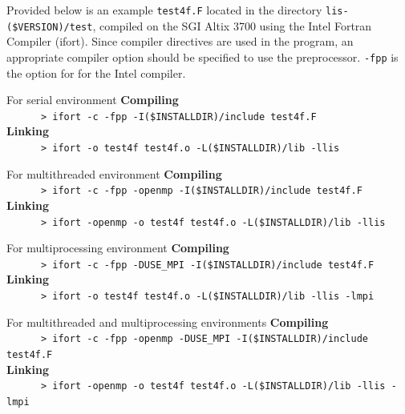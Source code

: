\documentclass[a4paper]{article}
\begin{document}
Provided below is an example \verb|test4f.F| located 
in the directory \verb|lis-($VERSION)/test|, compiled on the SGI Altix 3700 
using the Intel Fortran Compiler (ifort). 
Since compiler directives are used in the program, 
an appropriate compiler option should be specified to use the preprocessor.
\verb|-fpp| is the option for for the Intel compiler. 

\begin{itemsquarebox}[l]{For serial environment}
\small
{\bf Compiling}\\
\verb+      > ifort -c -fpp -I($INSTALLDIR)/include test4f.F+\\
{\bf Linking}\\
\verb+      > ifort -o test4f test4f.o -L($INSTALLDIR)/lib -llis+\\
\end{itemsquarebox}
\begin{itemsquarebox}[l]{For multithreaded environment}
\small
{\bf Compiling}\\
\verb+      > ifort -c -fpp -openmp -I($INSTALLDIR)/include test4f.F+\\
{\bf Linking}\\
\verb+      > ifort -openmp -o test4f test4f.o -L($INSTALLDIR)/lib -llis+\\
\end{itemsquarebox}
\begin{itemsquarebox}[l]{For multiprocessing environment}
\small
{\bf Compiling}\\
\verb+      > ifort -c -fpp -DUSE_MPI -I($INSTALLDIR)/include test4f.F+\\
{\bf Linking}\\
\verb+      > ifort -o test4f test4f.o -L($INSTALLDIR)/lib -llis -lmpi+\\
\end{itemsquarebox}
\begin{itemsquarebox}[l]{For multithreaded and multiprocessing environments}
\small
{\bf Compiling}\\
\verb+      > ifort -c -fpp -openmp -DUSE_MPI -I($INSTALLDIR)/include test4f.F+\\
{\bf Linking}\\
\verb+      > ifort -openmp -o test4f test4f.o -L($INSTALLDIR)/lib -llis -lmpi+\\
\end{itemsquarebox}
\end{document}
